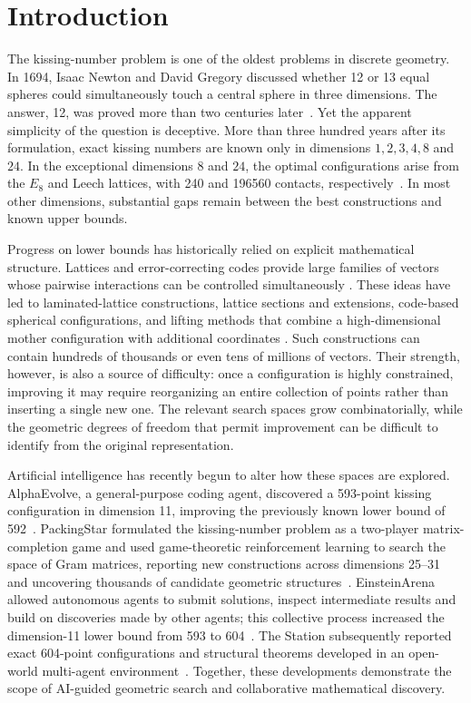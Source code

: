 \section{Introduction}\label{sec:introduction}
The kissing-number problem is one of the oldest problems in discrete
geometry. In 1694, Isaac Newton and David Gregory discussed whether
12 or 13 equal spheres could simultaneously touch a central sphere in
three dimensions. The answer, 12, was proved more than two centuries
later~\cite{musin}. Yet the apparent simplicity of the question is
deceptive. More than three hundred years after its formulation, exact
kissing numbers are known only in dimensions $1,2,3,4,8$ and $24$.
In the exceptional dimensions $8$ and $24$, the optimal configurations
arise from the $E_8$ and Leech lattices, with 240 and 196560 contacts,
respectively~\cite{conway1999sphere,musin}. In most other dimensions,
substantial gaps remain between the best constructions and known upper
bounds.

Progress on lower bounds has historically relied on explicit mathematical
structure. Lattices and error-correcting codes provide large families of
vectors whose pairwise interactions can be controlled simultaneously
\cite{conway1999sphere,macwilliams}. These ideas have led to
laminated-lattice constructions, lattice sections and extensions,
code-based spherical configurations, and lifting methods that combine
a high-dimensional mother configuration with additional coordinates
\cite{laminated,antipode,ers,cjkt,kallal}. Such constructions can contain
hundreds of thousands or even tens of millions of vectors. Their strength,
however, is also a source of difficulty: once a configuration is highly
constrained, improving it may require reorganizing an entire collection
of points rather than inserting a single new one. The relevant search
spaces grow combinatorially, while the geometric degrees of freedom that
permit improvement can be difficult to identify from the original
representation.

Artificial intelligence has recently begun to alter how these spaces are
explored. AlphaEvolve, a general-purpose coding agent, discovered a
593-point kissing configuration in dimension 11, improving the previously
known lower bound of 592~\cite{alphaevolve}. PackingStar formulated the kissing-number
problem as a two-player matrix-completion game and used game-theoretic
reinforcement learning to search the space of Gram matrices, reporting
new constructions across dimensions 25--31 and uncovering thousands of
candidate geometric structures~\cite{packingstar-discovery}. EinsteinArena
allowed autonomous agents to submit solutions, inspect intermediate
results and build on discoveries made by other agents; this collective
process increased the dimension-11 lower bound from 593 to
604~\cite{einsteinarena}. The Station subsequently reported exact
604-point configurations and structural theorems developed in an
open-world multi-agent environment~\cite{station}. Together, these
developments demonstrate the scope of AI-guided geometric search and
collaborative mathematical discovery.

